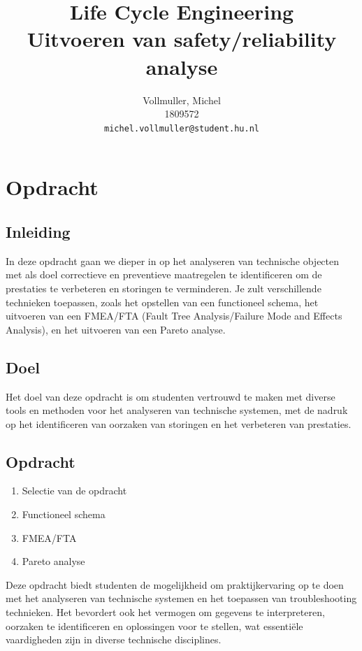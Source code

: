 \documentclass{article}
\title{
    Life Cycle Engineering \\
    \large Uitvoeren van safety/reliability analyse}
\author{
  Vollmuller, Michel\\
  1809572\\
  \texttt{michel.vollmuller@student.hu.nl}
}
\begin{document}
\maketitle


\tableofcontents

\setlength{\parindent}{0pt} %

\newpage
\section{Opdracht}
\subsection{Inleiding}
In deze opdracht gaan we dieper in op het analyseren van technische objecten met als doel correctieve en preventieve maatregelen te identificeren om de prestaties te verbeteren en storingen te verminderen. Je zult verschillende technieken toepassen, zoals het opstellen van een functioneel schema, het uitvoeren van een FMEA/FTA (Fault Tree Analysis/Failure Mode and Effects Analysis), en het uitvoeren van een Pareto analyse.

\subsection{Doel}
Het doel van deze opdracht is om studenten vertrouwd te maken met diverse tools en methoden voor het analyseren van technische systemen, met de nadruk op het identificeren van oorzaken van storingen en het verbeteren van prestaties.

\subsection{Opdracht}
\begin{enumerate}
  \item Selectie van de opdracht
  \item Functioneel schema
  \item FMEA/FTA
  \item Pareto analyse
\end{enumerate}

Deze opdracht biedt studenten de mogelijkheid om praktijkervaring op te doen met het analyseren van technische systemen en het toepassen van troubleshooting technieken. Het bevordert ook het vermogen om gegevens te interpreteren, oorzaken te identificeren en oplossingen voor te stellen, wat essentiële vaardigheden zijn in diverse technische disciplines.
\end{document}
